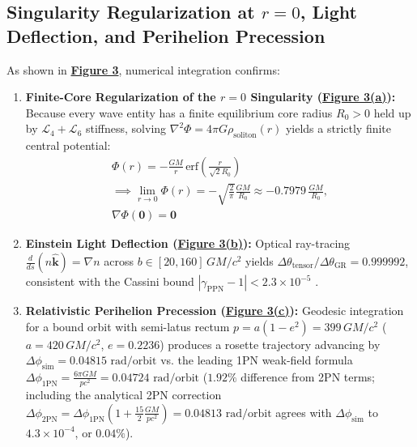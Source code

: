\documentclass[10pt,aps,prd,twocolumn,superscriptaddress,nofootinbib,floatfix,longbibliography,showkeys]{revtex4-2}
\begin{document}
\subsection{Singularity Regularization at $r=0$, Light Deflection, and Perihelion Precession}\label{sec:5.2}

As shown in \textbf{\hyperref[fig:fig3]{Figure 3}}, numerical integration confirms:
\begin{enumerate}
  \item \textbf{Finite-Core Regularization of the $r=0$ Singularity (\hyperref[fig:fig3]{Figure 3(a)}):} Because every wave entity has a finite equilibrium core radius $R_0 > 0$ held up by $\mathcal{L}_4 + \mathcal{L}_6$ stiffness, solving $\nabla^2 \Phi = 4\pi G \rho_{\text{soliton}}(r)$ yields a strictly finite central potential:
\begin{equation}\begin{gathered}
\Phi(r) = -\frac{GM}{r}\,\text{erf}\!\left(\frac{r}{\sqrt{2}R_0}\right) \\
\implies \lim_{r \to 0} \Phi(r) = -\sqrt{\frac{2}{\pi}}\frac{GM}{R_0} \approx -0.7979\,\frac{GM}{R_0}, \\
\nabla\Phi(\mathbf{0}) = \mathbf{0}
\end{gathered}\end{equation}
  \item \textbf{Einstein Light Deflection (\hyperref[fig:fig3]{Figure 3(b)}):} Optical ray-tracing $\frac{d}{ds}(n\hat{\mathbf{k}}) = \nabla n$ across $b \in [20, 160]\,GM/c^2$ yields $\Delta\theta_{\text{tensor}}/\Delta\theta_{\text{GR}} = 0.999992$, consistent with the Cassini bound $|\gamma_{\text{PPN}} - 1| < 2.3 \times 10^{-5}$ \cite{ref21}.
  \item \textbf{Relativistic Perihelion Precession (\hyperref[fig:fig3]{Figure 3(c)}):} Geodesic integration for a bound orbit with semi-latus rectum $p = a(1 - e^2) = 399\,GM/c^2$ ($a = 420\,GM/c^2$, $e = 0.2236$) produces a rosette trajectory advancing by $\Delta\phi_{\text{sim}} = 0.04815\text{ rad/orbit}$ vs. the leading 1PN weak-field formula $\Delta\phi_{\text{1PN}} = \frac{6\pi GM}{p c^2} = 0.04724\text{ rad/orbit}$ ($1.92\%$ difference from 2PN terms; including the analytical 2PN correction $\Delta\phi_{\text{2PN}} = \Delta\phi_{\text{1PN}}\!\left(1 + \frac{15}{2}\frac{GM}{p c^2}\right) = 0.04813\text{ rad/orbit}$ agrees with $\Delta\phi_{\text{sim}}$ to $4.3 \times 10^{-4}$, or $0.04\%$).

\end{enumerate}
\end{document}
